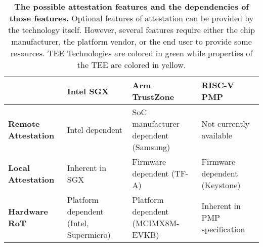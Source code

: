 \begin{table*}[p]
\begin{center}
\begin{tabular}{|L{3cm}|L{3.25cm}|L{3.25cm}|L{3.25cm}|}
\hline
\textbf{}                                           & \textbf{Intel SGX} & \textbf{Arm TrustZone} & \textbf{RISC-V PMP} \\ \hline
{}\textbf{Remote Attestation} & Intel dependent                            & SoC manufacturer dependent (Samsung)                     & Not currently available                     \\ \hline
{}\textbf{Local Attestation}  & Inherent in SGX                            & Firmware dependent (TF-A)                            & Firmware dependent (Keystone)                          \\ \hline
{}\textbf{Hardware RoT}       & Platform dependent (Intel, Supermicro)                       & Platform dependent  (MCIMX8M-EVKB)                           & Inherent in PMP specification                   \\ \hline
\end{tabular}
\end{center}
\caption[Attestation Comparison]{\textbf{The possible attestation features and the dependencies of those features.} Optional features of attestation can be provided by the technology itself. However, several features require either the chip manufacturer, the platform vendor, or the end user to provide some resources. TEE Technologies are colored in \colorbox{tbl-gre}{green} while properties of the TEE are colored in \colorbox{tbl-yel}{yellow}.}
\label{tab:attest-compare}
\end{table*}


